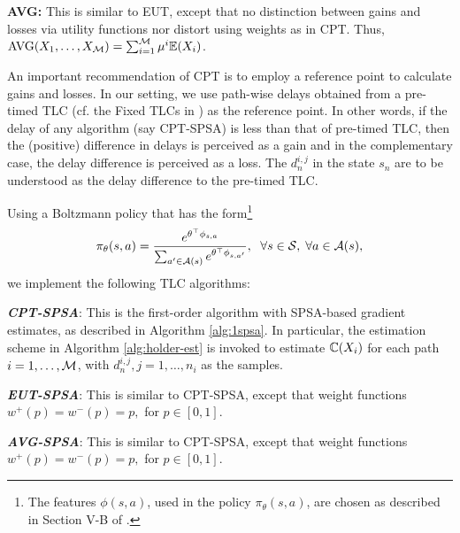 \textbf{AVG:} This is similar to EUT, except that no distinction between gains and losses via utility functions nor distort using weights as in CPT. Thus, $\text{AVG}(X_1,\ldots,X_{\mathcal{M}}) = \sum_{i=1}^{\mathcal{M}} \mu^i \mathbb{E}(X_i)$. 

An important recommendation of CPT is to employ a reference point to calculate gains and losses. 
In our setting, we use path-wise delays obtained from a pre-timed TLC (cf. the Fixed TLCs in \cite{prashanth2011reinforcement}) as the reference point. In other words, if the delay of any algorithm (say CPT-SPSA) is less than that of pre-timed TLC, then the (positive) difference in delays is perceived as a gain and in the complementary case, the delay difference is perceived as a loss. The $d_n^{i,j}$ in the state $s_n$ are to be understood as the delay difference to the pre-timed TLC.  


Using a Boltzmann policy that has the form\footnote{The features $\phi(s,a)$, used in the policy $\pi_{\theta}(s,a)$, are chosen as described in Section V-B of \cite{prashanth2012threshold}.}
$$
\pi_{\theta}(s,a) = \frac{e^{\theta^{\top} \phi_{s,a}}}{\sum_{a' \in {\mathcal{A}(s)}} e^{\theta^{\top} \phi_{s,a'}}},
\hspace{6pt} \forall s \in \mathcal{S},\;\forall a \in \mathcal{A}(s),
$$
we implement the following TLC algorithms:

{\bf\em CPT-SPSA}: This is the first-order algorithm with SPSA-based gradient estimates, as described in Algorithm \ref{alg:1spsa}. In particular, the estimation scheme in Algorithm \ref{alg:holder-est} is invoked to estimate $\mathbb{C}(X_i)$ for each path $i=1,\ldots,\mathcal{M}$, with $d_n^{i,j}, j=1,\ldots,n_i$ as the samples.

{\bf\em EUT-SPSA}: This is similar to CPT-SPSA, except that weight functions $w^+(p)=w^-(p)=p,$ for $p\in [0,1]$. 

{\bf\em AVG-SPSA}: This is similar to CPT-SPSA, except that weight functions $w^+(p)=w^-(p)=p,$ for $p\in [0,1]$. 

